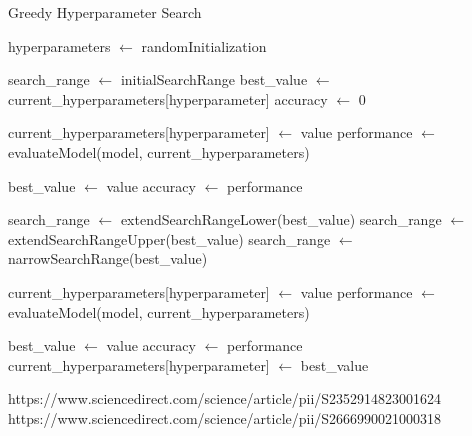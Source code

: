 \begin{algorithm}
    \caption{Greedy Hyperparameter Search}\label{alg:greedy_hyperparameter_search}
    \begin{algorithmic}[1]
        \State hyperparameters $\gets$ randomInitialization
        
            \State search\_range $\gets$ initialSearchRange
            \State best\_value $\gets$ current\_hyperparameters[hyperparameter]
            \State accuracy $\gets$ 0
            
                \State current\_hyperparameters[hyperparameter] $\gets$ value
                \State performance $\gets$ evaluateModel(model, current\_hyperparameters)
                
                    \State best\_value $\gets$ value
                    \State accuracy $\gets$ performance
                \EndIf
            \EndFor
            
                \State search\_range $\gets$ extendSearchRangeLower(best\_value)
                \State search\_range $\gets$ extendSearchRangeUpper(best\_value)
            \Else
                \State search\_range $\gets$ narrowSearchRange(best\_value)
            \EndIf
            
                \State current\_hyperparameters[hyperparameter] $\gets$ value
                \State performance $\gets$ evaluateModel(model, current\_hyperparameters)
                
                    \State best\_value $\gets$ value
                    \State accuracy $\gets$ performance
                \EndIf
            \EndFor
            \State current\_hyperparameters[hyperparameter] $\gets$ best\_value
        \EndFor
    \end{algorithmic}
\end{algorithm}



https://www.sciencedirect.com/science/article/pii/S2352914823001624
https://www.sciencedirect.com/science/article/pii/S2666990021000318